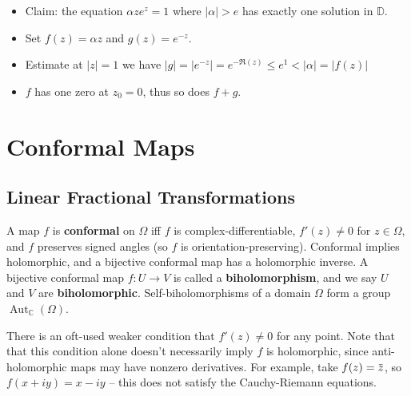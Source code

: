 \begin{example}

\envlist

\begin{itemize}
\tightlist
\item
  Claim: the equation \(\alpha z e^z = 1\) where
  \({\left\lvert {\alpha} \right\rvert} > e\) has exactly one solution
  in \({\mathbb{D}}\).
\item
  Set \(f(z) = \alpha z\) and \(g(z) = e^{-z}\).
\item
  Estimate at \({\left\lvert {z} \right\rvert} =1\) we have
  \({\left\lvert {g} \right\rvert} ={\left\lvert {e^{-z}} \right\rvert} = e^{-\Re(z)} \leq e^1 < {\left\lvert {\alpha} \right\rvert} = {\left\lvert {f(z)} \right\rvert}\)
\item
  \(f\) has one zero at \(z_0 = 0\), thus so does \(f+g\).
\end{itemize}

\end{example}

\hypertarget{conformal-maps}{%
\section{Conformal Maps}\label{conformal-maps}}

\hypertarget{linear-fractional-transformations}{%
\subsection{Linear Fractional
Transformations}\label{linear-fractional-transformations}}

\begin{definition}

A map \(f\) is \textbf{conformal} on \(\Omega\) iff \(f\) is
complex-differentiable, \(f'(z)\neq 0\) for \(z\in \Omega\), and \(f\)
preserves signed angles (so \(f\) is orientation-preserving). Conformal
implies holomorphic, and a bijective conformal map has a holomorphic
inverse. A bijective conformal map \(f:U\to V\) is called a
\textbf{biholomorphism}, and we say \(U\) and \(V\) are
\textbf{biholomorphic}. Self-biholomorphisms of a domain \(\Omega\) form
a group \(\mathop{\mathrm{Aut}}_{\mathbb{C}}(\Omega)\).

\end{definition}

\begin{remark}

There is an oft-used weaker condition that \(f'(z) \neq 0\) for any
point. Note that that this condition alone doesn't necessarily imply
\(f\) is holomorphic, since anti-holomorphic maps may have nonzero
derivatives. For example, take
\(f(z) = \mkern 1.5mu\overline{\mkern-1.5muz\mkern-1.5mu}\mkern 1.5mu\),
so \(f(x+iy) = x-iy\) -- this does not satisfy the Cauchy-Riemann
equations.

\end{remark}

